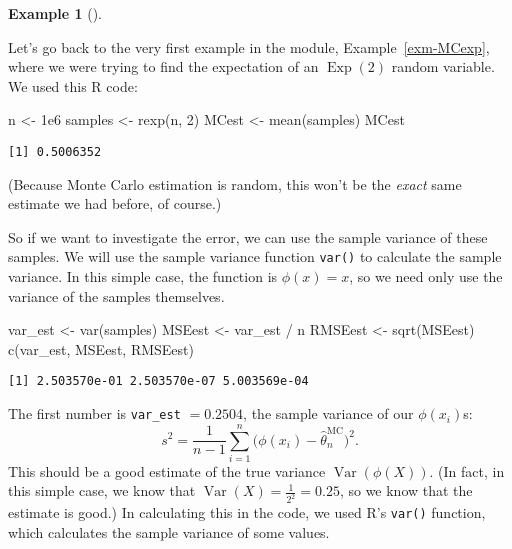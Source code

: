 \documentclass[
  letterpaper,
  DIV=11,
  numbers=noendperiod]{scrreprt}
\newenvironment{Shaded}{\begin{snugshade}}{\end{snugshade}}
\newcommand{\DecValTok}[1]{\textcolor[rgb]{0.68,0.00,0.00}{#1}}
\newcommand{\FloatTok}[1]{\textcolor[rgb]{0.68,0.00,0.00}{#1}}
\newcommand{\FunctionTok}[1]{\textcolor[rgb]{0.28,0.35,0.67}{#1}}
\newcommand{\NormalTok}[1]{\textcolor[rgb]{0.00,0.23,0.31}{#1}}
\newcommand{\OtherTok}[1]{\textcolor[rgb]{0.00,0.23,0.31}{#1}}
\newcommand{\SpecialCharTok}[1]{\textcolor[rgb]{0.37,0.37,0.37}{#1}}
\theoremstyle{plain}
\theoremstyle{definition}
\theoremstyle{definition}
\newtheorem{example}{Example}[chapter]
\theoremstyle{remark}
\begin{document}
\begin{example}[]\protect\hypertarget{exm-MCexp2}{}\label{exm-MCexp2}

Let's go back to the very first example in the module,
Example~\ref{exm-MCexp}, where we were trying to find the expectation of
an \(\operatorname{Exp}(2)\) random variable. We used this R code:

\begin{Shaded}
\begin{Highlighting}[]
\NormalTok{n }\OtherTok{\textless{}{-}} \FloatTok{1e6}
\NormalTok{samples }\OtherTok{\textless{}{-}} \FunctionTok{rexp}\NormalTok{(n, }\DecValTok{2}\NormalTok{)}
\NormalTok{MCest }\OtherTok{\textless{}{-}} \FunctionTok{mean}\NormalTok{(samples)}
\NormalTok{MCest}
\end{Highlighting}
\end{Shaded}

\begin{verbatim}
[1] 0.5006352
\end{verbatim}

(Because Monte Carlo estimation is random, this won't be the
\emph{exact} same estimate we had before, of course.)

So if we want to investigate the error, we can use the sample variance
of these samples. We will use the sample variance function
\texttt{var()} to calculate the sample variance. In this simple case,
the function is \(\phi(x) = x\), so we need only use the variance of the
samples themselves.

\begin{Shaded}
\begin{Highlighting}[]
\NormalTok{var\_est }\OtherTok{\textless{}{-}} \FunctionTok{var}\NormalTok{(samples)}
\NormalTok{MSEest  }\OtherTok{\textless{}{-}}\NormalTok{ var\_est }\SpecialCharTok{/}\NormalTok{ n}
\NormalTok{RMSEest }\OtherTok{\textless{}{-}} \FunctionTok{sqrt}\NormalTok{(MSEest)}
\FunctionTok{c}\NormalTok{(var\_est, MSEest, RMSEest)}
\end{Highlighting}
\end{Shaded}

\begin{verbatim}
[1] 2.503570e-01 2.503570e-07 5.003569e-04
\end{verbatim}

The first number is \texttt{var\_est} \(= 0.2504\), the sample variance
of our \(\phi(x_i)\)s:\\
\[ s^2 = \frac{1}{n-1} \sum_{i=1}^n \big(\phi(x_i) - \widehat{\theta}_n^{\mathrm{MC}}\big)^2 . \]
This should be a good estimate of the true variance
\(\operatorname{Var}(\phi(X))\). (In fact, in this simple case, we know
that \(\operatorname{Var}(X) = \frac{1}{2^2} = 0.25\), so we know that
the estimate is good.) In calculating this in the code, we used R's
\texttt{var()} function, which calculates the sample variance of some
values.


\end{example}
\end{document}
